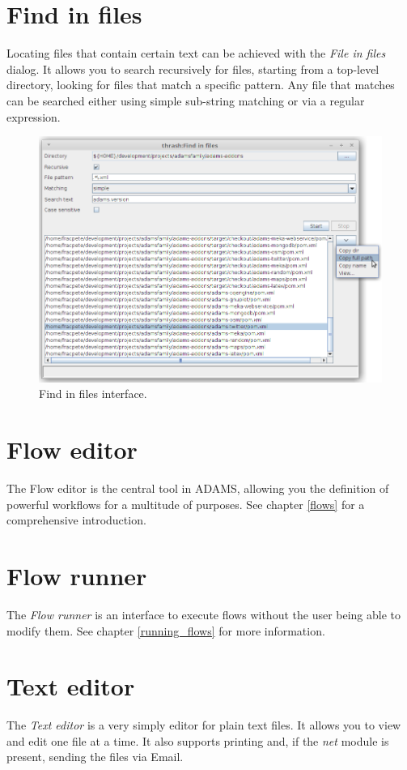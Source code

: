 \clearpage
\section{Find in files}
Locating files that contain certain text can be achieved with the
\textit{File in files} dialog. It allows you to search recursively
for files, starting from a top-level directory, looking for files that
match a specific pattern. Any file that matches can be searched either
using simple sub-string matching or via a regular expression.

\begin{figure}[htb]
  \centering
  \includegraphics[width=12.0cm]{images/findinfiles.png}
  \caption{Find in files interface.}
  \label{findinfiles}
\end{figure}

\clearpage
\section{Flow editor}
The Flow editor is the central tool in ADAMS, allowing you the definition of
powerful workflows for a multitude of purposes. See chapter \ref{flows} for a
comprehensive introduction.

\section{Flow runner}
The \textit{Flow runner} is an interface to execute flows without the user
being able to modify them. See chapter \ref{running_flows} for more information.

\section{Text editor}
The \textit{Text editor} is a very simply editor for plain text files. It 
allows you to view and edit one file at a time. It also supports printing
and, if the \textit{net} module is present, sending the files via Email.

